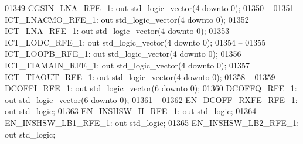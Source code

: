 \begin{DoxyCode}
01349         CGSIN\_LNA\_RFE\_1:    \textcolor{keywordflow}{out} \textcolor{comment}{std\_logic\_vector}(\textcolor{vhdllogic}{}\textcolor{vhdllogic}{4} \textcolor{keywordflow}{downto} \textcolor{vhdllogic}{}\textcolor{vhdllogic}{0});
01350 \textcolor{keyword}{        --}
01351         ICT\_LNACMO\_RFE\_1:   \textcolor{keywordflow}{out} \textcolor{comment}{std\_logic\_vector}(\textcolor{vhdllogic}{}\textcolor{vhdllogic}{4} \textcolor{keywordflow}{downto} \textcolor{vhdllogic}{}\textcolor{vhdllogic}{0});
01352         ICT\_LNA\_RFE\_1:  \textcolor{keywordflow}{out} \textcolor{comment}{std\_logic\_vector}(\textcolor{vhdllogic}{}\textcolor{vhdllogic}{4} \textcolor{keywordflow}{downto} \textcolor{vhdllogic}{}\textcolor{vhdllogic}{0});
01353         ICT\_LODC\_RFE\_1: \textcolor{keywordflow}{out} \textcolor{comment}{std\_logic\_vector}(\textcolor{vhdllogic}{}\textcolor{vhdllogic}{4} \textcolor{keywordflow}{downto} \textcolor{vhdllogic}{}\textcolor{vhdllogic}{0});
01354 \textcolor{keyword}{        --}
01355         ICT\_LOOPB\_RFE\_1:    \textcolor{keywordflow}{out} \textcolor{comment}{std\_logic\_vector}(\textcolor{vhdllogic}{}\textcolor{vhdllogic}{4} \textcolor{keywordflow}{downto} \textcolor{vhdllogic}{}\textcolor{vhdllogic}{0});
01356         ICT\_TIAMAIN\_RFE\_1:  \textcolor{keywordflow}{out} \textcolor{comment}{std\_logic\_vector}(\textcolor{vhdllogic}{}\textcolor{vhdllogic}{4} \textcolor{keywordflow}{downto} \textcolor{vhdllogic}{}\textcolor{vhdllogic}{0});
01357         ICT\_TIAOUT\_RFE\_1:   \textcolor{keywordflow}{out} \textcolor{comment}{std\_logic\_vector}(\textcolor{vhdllogic}{}\textcolor{vhdllogic}{4} \textcolor{keywordflow}{downto} \textcolor{vhdllogic}{}\textcolor{vhdllogic}{0});
01358 \textcolor{keyword}{        --}
01359         DCOFFI\_RFE\_1:   \textcolor{keywordflow}{out} \textcolor{comment}{std\_logic\_vector}(\textcolor{vhdllogic}{}\textcolor{vhdllogic}{6} \textcolor{keywordflow}{downto} \textcolor{vhdllogic}{}\textcolor{vhdllogic}{0});
01360         DCOFFQ\_RFE\_1:   \textcolor{keywordflow}{out} \textcolor{comment}{std\_logic\_vector}(\textcolor{vhdllogic}{}\textcolor{vhdllogic}{6} \textcolor{keywordflow}{downto} \textcolor{vhdllogic}{}\textcolor{vhdllogic}{0});
01361 \textcolor{keyword}{        --}
01362         EN\_DCOFF\_RXFE\_RFE\_1:    \textcolor{keywordflow}{out} \textcolor{comment}{std\_logic};
01363         EN\_INSHSW\_H\_RFE\_1:  \textcolor{keywordflow}{out} \textcolor{comment}{std\_logic};
01364         EN\_INSHSW\_LB1\_RFE\_1:    \textcolor{keywordflow}{out} \textcolor{comment}{std\_logic};
01365         EN\_INSHSW\_LB2\_RFE\_1:    \textcolor{keywordflow}{out} \textcolor{comment}{std\_logic};

\end{DoxyCode}
